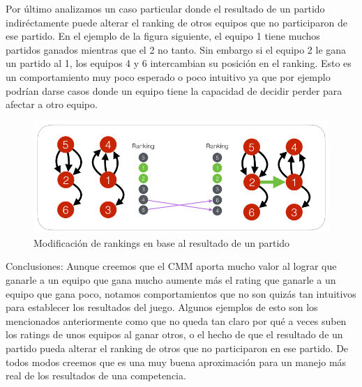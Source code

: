 Por \'ultimo analizamos un caso particular donde el resultado de un partido indir\'ectamente puede alterar el ranking de otros equipos que no participaron de ese partido. En el ejemplo de la figura siguiente, el equipo 1 tiene muchos partidos ganados mientras que el 2 no tanto. Sin embargo si el equipo 2 le gana un partido al 1, los equipos 4 y 6 intercambian su posici\'on en el ranking. Esto es un comportamiento muy poco esperado o poco intuitivo ya que por ejemplo podr\'ian darse casos donde un equipo tiene la capacidad de decidir perder para afectar a otro equipo.

\begin{figure}[h!]
  \begin{center}
	\includegraphics[scale=0.50]{imagenes/cualitative/fairness/fairness4.png}
	\caption{Modificaci\'on de rankings en base al resultado de un partido}
	\label{bChange}
  \end{center}
\end{figure}

Conclusiones: Aunque creemos que el CMM aporta mucho valor al lograr que ganarle a un equipo que gana mucho aumente m\'as el rating que ganarle a un equipo que gana poco, notamos comportamientos que no son quiz\'as tan intuitivos para establecer los resultados del juego. Algunos ejemplos de esto son los mencionados anteriormente como que no queda tan claro por qu\'e a veces suben los ratings de unos equipos al ganar otros, o el hecho de que el resultado de un partido pueda alterar el ranking de otros que no participaron en ese partido. De todos modos creemos que es una muy buena aproximaci\'on para un manejo m\'as real de los resultados de una competencia.

